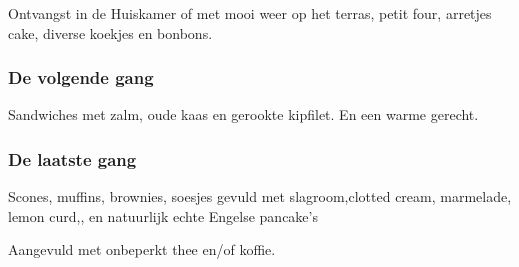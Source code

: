 Ontvangst in de Huiskamer of met mooi weer op het terras,
petit four, arretjes cake, diverse koekjes en bonbons.

\subsubsection*{De volgende gang}

Sandwiches met zalm, oude kaas en gerookte kipfilet.
En een warme gerecht.

\subsubsection*{De laatste gang}
Scones, muffins, brownies, soesjes gevuld met slagroom,clotted cream, marmelade, lemon curd,, en natuurlijk echte Engelse pancake’s

Aangevuld met onbeperkt thee en/of koffie.
